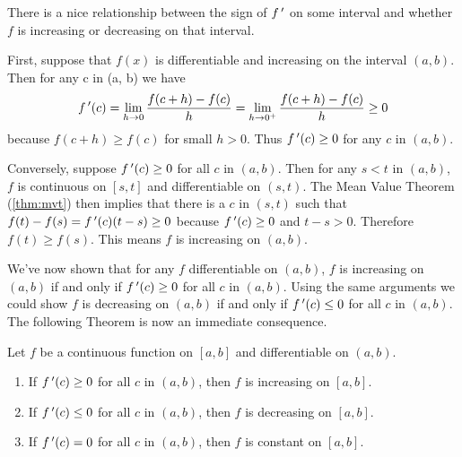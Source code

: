 There is a nice relationship between the sign of $f\,'$ on some interval and whether $f$ is increasing or decreasing on that interval.

First, suppose that $f(x)$ is differentiable and increasing on the interval $(a,b)$. Then for any c in (a, b) we have
\[f\,'(c)=\lim_{h\to0}\frac{f(c+h)-f(c)}h=\lim_{h\to0^+}\frac{f(c+h)-f(c)}h\ge0\]
because $f(c+h)\ge f(c)$ for small $h>0$. Thus $f\,'(c)\ge0$ for any $c$ in $(a,b)$.

Conversely, suppose $f\,'(c)\ge0$ for all $c$ in $(a,b)$. Then for any $s<t$ in $(a,b)$, $f$ is continuous on $[s,t]$ and differentiable on $(s,t)$. The Mean Value Theorem (\autoref{thm:mvt}) then implies that there is a $c$ in $(s,t)$ such that
$f(t)-f(s)=f\,'(c)(t-s)\ge0$
because $f\,'(c)\ge0$ and $t-s>0$. Therefore $f(t)\ge f(s)$. This means $f$ is increasing on $(a,b)$.

We've now shown that for any $f$ differentiable on $(a,b)$,
$f$ is increasing on $(a,b)$ if and only if $f\,'(c)\ge0$ for all $c$ in $(a,b)$.
Using the same arguments we could show $f$ is decreasing on $(a,b)$ if and only if $f\,'(c)\le0$ for all $c$ in $(a,b)$. The following Theorem is now an immediate consequence.


\begin{theorem}\label{thm:incr_decr}%
Let $f$ be a continuous function on $[a,b]$ and differentiable on $(a,b)$.
\begin{enumerate}
\item	If $f\,'(c) \ge 0$ for all $c$ in $(a,b)$, then $f$ is increasing on $[a,b]$.
\item	If $f\,'(c) \le 0$ for all $c$ in $(a,b)$, then $f$ is decreasing on $[a,b]$.
\item	If $f\,'(c) =0$ for all $c$ in $(a,b)$, then $f$ is constant on $[a,b]$.
\end{enumerate}
\end{theorem}


